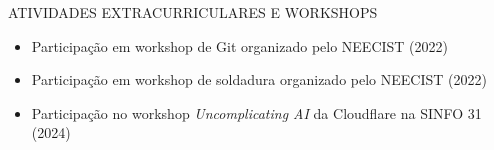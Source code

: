\documentclass[14pt]{resume} %
\begin{document}



\begin{rSection}{ATIVIDADES EXTRACURRICULARES E WORKSHOPS} 
\begin{itemize}
    \vspace{1ex}
    \item 	Participação em workshop de Git organizado pelo NEECIST (2022)
    \vspace{2ex}
    \item	Participação em workshop de soldadura organizado pelo NEECIST (2022)
    \vspace{2ex}
    \item   Participação no workshop \textit{Uncomplicating AI} da Cloudflare na SINFO 31 (2024) 
\end{itemize}


\end{rSection}



\end{document}
